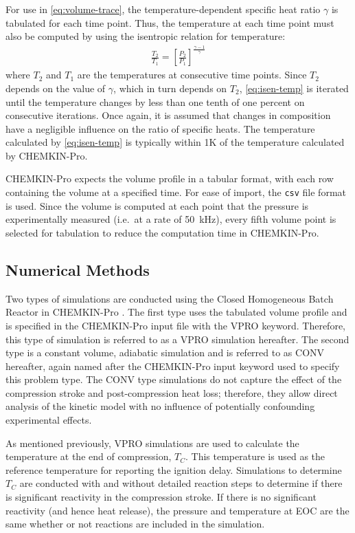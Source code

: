\documentclass[../main.tex]{subfiles}
\begin{document}
For use in \cref{eq:volume-trace}, the temperature-dependent specific
heat ratio $\gamma$ is tabulated for each time point. Thus, the
temperature at each time point must also be computed by using the
isentropic relation for temperature:
%
\begin{align}
\frac{T_2}{T_1} = \left[\frac{P_2}{P_1}\right]^{\frac{\gamma-1}{\gamma}}
\label{eq:isen-temp}
\end{align}
%
where $T_2$ and $T_1$ are the temperatures at consecutive time points.
Since $T_2$ depends on the value of $\gamma$, which in turn depends
on $T_2$, \cref{eq:isen-temp} is iterated until the temperature
changes by less than one tenth of one percent on consecutive iterations.
Once again, it is assumed that changes in composition have a negligible
influence on the ratio of specific heats.
The temperature calculated by \cref{eq:isen-temp} is typically within
1K of the temperature calculated by CHEMKIN-Pro.

CHEMKIN-Pro expects the volume profile in a tabular format, with each row
containing the volume at a specified time. For ease of import, the
\texttt{csv} file format is used. Since the volume is computed at each
point that the pressure is experimentally measured (i.e.\ at a rate of
\SI{50}{\kilo\hertz}), every fifth volume point is selected for tabulation
to reduce the computation time in CHEMKIN-Pro.

\subsection{Numerical Methods}
Two types of simulations are conducted using the Closed Homogeneous
Batch Reactor in CHEMKIN-Pro \cite{Chemkin2012}. The first type uses the
tabulated volume profile and is specified in the CHEMKIN-Pro input file
with the VPRO keyword. Therefore, this type of simulation is referred to
as a VPRO simulation hereafter. The second type is a constant volume,
adiabatic simulation and is referred to as CONV hereafter, again named
after the CHEMKIN-Pro input keyword used to specify this problem type.
The CONV type simulations do not capture the effect of the compression
stroke and post-compression heat loss; therefore, they allow direct
analysis of the kinetic model with no influence of potentially
confounding experimental effects.

As mentioned previously, VPRO simulations are used to calculate the
temperature at the end of compression, $T_C$. This temperature is used
as the reference temperature for reporting the ignition delay.
Simulations to determine $T_C$ are conducted with and without detailed
reaction steps to determine if there is significant reactivity in the
compression stroke. If there is no significant reactivity
(and hence heat release), the pressure and temperature at EOC are the
same whether or not reactions are included in the simulation.
\end{document}
